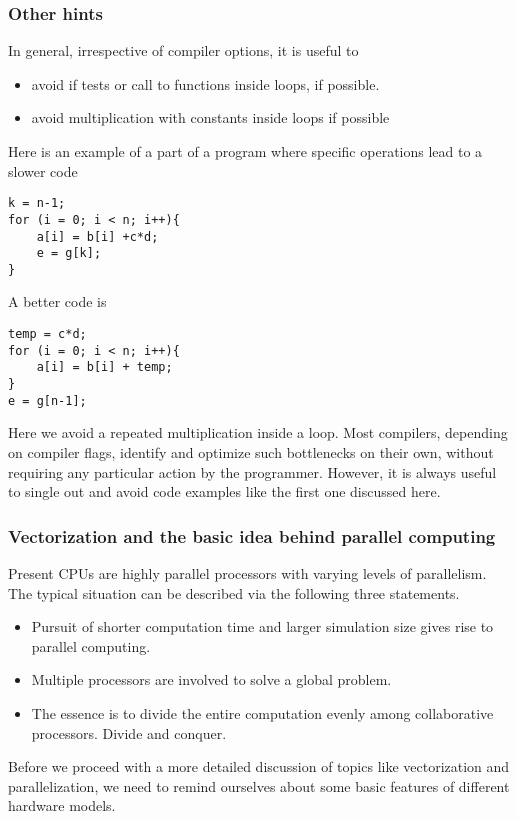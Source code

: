 \documentclass{beamer}
\begin{document}
\begin{frame}
\frametitle{Other hints}

\begin{block}{}
In general, irrespective of compiler options, it is useful to
\begin{itemize}
\item avoid if tests or call to functions inside loops, if possible. 

\item avoid multiplication with constants inside loops if possible
\end{itemize}

\noindent
Here is an example of a part of a program where specific operations lead to a slower code
\begin{verbatim}
k = n-1;
for (i = 0; i < n; i++){
    a[i] = b[i] +c*d;
    e = g[k];
}
\end{verbatim}
A better code is
\begin{verbatim}
temp = c*d;
for (i = 0; i < n; i++){
    a[i] = b[i] + temp;
}
e = g[n-1];
\end{verbatim}
Here we avoid a repeated multiplication inside a loop. 
Most compilers, depending on compiler flags, identify and optimize such bottlenecks on their own, without requiring any particular action by the programmer. However, it is always useful to single out and avoid code examples like the first one discussed here.
\end{block}
\end{frame}

\begin{frame}
\frametitle{Vectorization and the basic idea behind parallel computing}

\begin{block}{}
Present CPUs are highly parallel processors with varying levels of parallelism. The typical situation can be described via the following three statements.
\begin{itemize}
\item Pursuit of shorter computation time and larger simulation size gives rise to parallel computing.

\item Multiple processors are involved to solve a global problem.

\item The essence is to divide the entire computation evenly among collaborative processors.  Divide and conquer.
\end{itemize}

\noindent
Before we proceed with a more detailed discussion of topics like vectorization and parallelization, we need to remind ourselves about some basic features of different hardware models. 

\end{block}
\end{frame}
\end{document}
